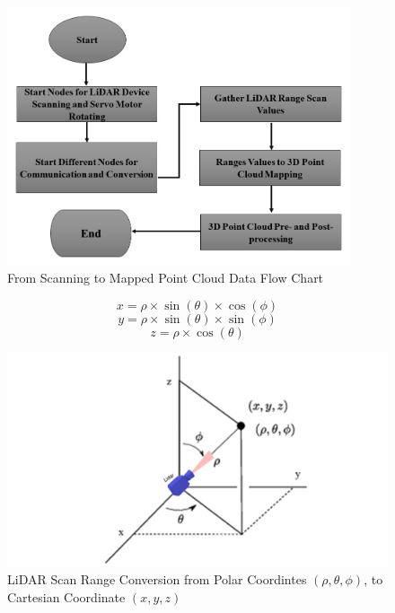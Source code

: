 \begin{figure}[H]
	\centering
	\includegraphics[width=0.9\textwidth]{Figures/scanning-to-pc-flow-chart}
	\caption{From Scanning to Mapped Point Cloud Data Flow Chart}
	\label{ch3:fig:scanning-to-pc-flow-chart}
\end{figure}

\begin{equation}
	\label{ch3:eq:x}
	x = \rho \times \sin(\theta) \times \cos(\phi)
\end{equation}
\begin{equation}
	\label{ch3:eq:y}
	y = \rho \times \sin(\theta) \times \sin(\phi)
\end{equation}
\begin{equation}
	\label{ch3:eq:z}
	z = \rho \times \cos(\theta)
\end{equation}

\begin{figure}[H]
	\centering
	\includegraphics[width=1\textwidth]{Figures/point cloud conversion}
	\caption{LiDAR Scan Range Conversion from Polar Coordintes $(\rho,\theta,\phi)$, to Cartesian Coordinate $(x,y,z)$}
	\label{ch3:fig:point_cloud_conversion}
\end{figure}

